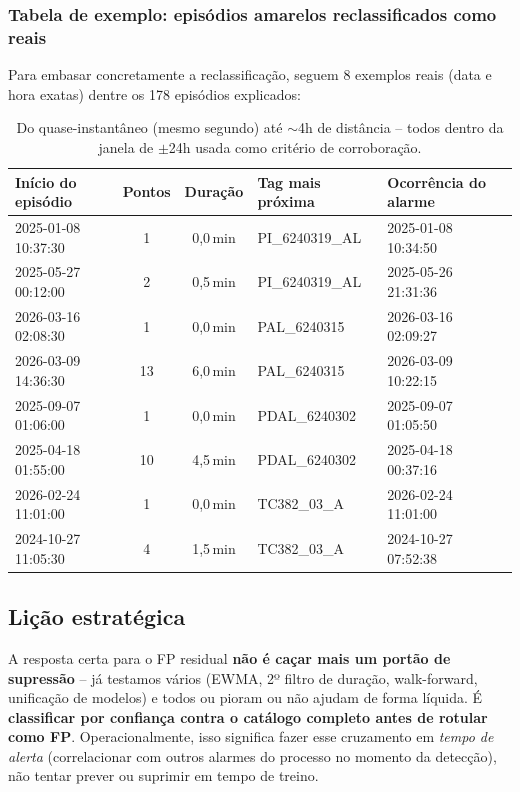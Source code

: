 \documentclass[11pt,a4paper]{article}
\begin{document}
\subsubsection{Tabela de exemplo: episódios amarelos reclassificados como reais}
\label{sec:tabela-exemplos}

Para embasar concretamente a reclassificação, seguem 8 exemplos reais
(data e hora exatas) dentre os 178 episódios explicados:

\begin{table}[H]
\centering
\small
\begin{tabular}{lccll}
\toprule
\textbf{Início do episódio} & \textbf{Pontos} & \textbf{Duração} & \textbf{Tag mais próxima} & \textbf{Ocorrência do alarme} \\
\midrule
2025-01-08 10:37:30 & 1 & 0,0\,min & PI\_6240319\_AL & 2025-01-08 10:34:50 \\
2025-05-27 00:12:00 & 2 & 0,5\,min & PI\_6240319\_AL & 2025-05-26 21:31:36 \\
2026-03-16 02:08:30 & 1 & 0,0\,min & PAL\_6240315 & 2026-03-16 02:09:27 \\
2026-03-09 14:36:30 & 13 & 6,0\,min & PAL\_6240315 & 2026-03-09 10:22:15 \\
2025-09-07 01:06:00 & 1 & 0,0\,min & PDAL\_6240302 & 2025-09-07 01:05:50 \\
2025-04-18 01:55:00 & 10 & 4,5\,min & PDAL\_6240302 & 2025-04-18 00:37:16 \\
2026-02-24 11:01:00 & 1 & 0,0\,min & TC382\_03\_A & 2026-02-24 11:01:00 \\
2024-10-27 11:05:30 & 4 & 1,5\,min & TC382\_03\_A & 2024-10-27 07:52:38 \\
\bottomrule
\end{tabular}
\caption{Do quase-instantâneo (mesmo segundo) até $\sim$4h de
distância -- todos dentro da janela de $\pm$24h usada como critério
de corroboração.}
\end{table}

\subsection{Lição estratégica}

A resposta certa para o FP residual \textbf{não é caçar mais um
portão de supressão} -- já testamos vários (EWMA, 2º filtro de
duração, walk-forward, unificação de modelos) e todos ou pioram ou não
ajudam de forma líquida. É \textbf{classificar por confiança contra o
catálogo completo antes de rotular como FP}. Operacionalmente, isso
significa fazer esse cruzamento em \emph{tempo de alerta}
(correlacionar com outros alarmes do processo no momento da detecção),
não tentar prever ou suprimir em tempo de treino.
\end{document}
